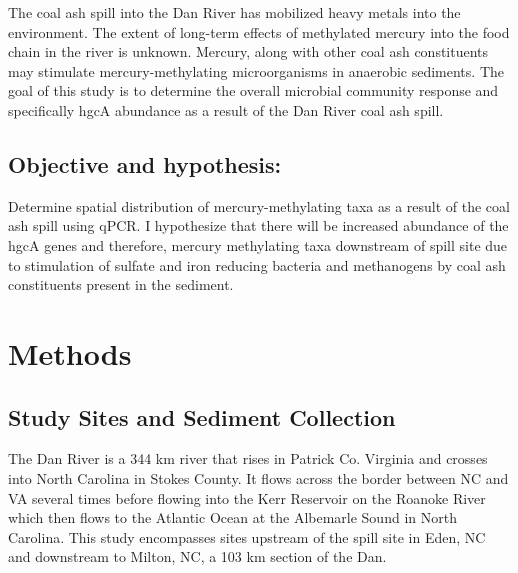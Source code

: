 \documentclass[ms]{uncgdissertationexp}
\theoremstyle{plain}
\theoremstyle{definition}
\theoremstyle{remark}
\begin{document}
  The coal ash spill into the Dan River has mobilized heavy metals into
  the environment. The extent of long-term effects of methylated mercury
  into the food chain in the river is unknown. Mercury, along with other
  coal ash constituents may stimulate mercury-methylating microorganisms
  in anaerobic sediments. The goal of this study is to determine the
  overall microbial community response and specifically hgcA abundance as
  a result of the Dan River coal ash spill.
  
  \subsection{Objective and hypothesis:}\label{objective-and-hypothesis}
  
  Determine spatial distribution of mercury-methylating taxa as a result
  of the coal ash spill using qPCR. I hypothesize that there will be
  increased abundance of the hgcA genes and therefore, mercury methylating
  taxa downstream of spill site due to stimulation of sulfate and iron
  reducing bacteria and methanogens by coal ash constituents present in
  the sediment.
  
  \section{Methods}\label{methods}
  
  \subsection{Study Sites and Sediment
  Collection}\label{study-sites-and-sediment-collection}
  
  The Dan River is a 344 km river that rises in Patrick Co. Virginia and
  crosses into North Carolina in Stokes County. It flows across the border
  between NC and VA several times before flowing into the Kerr Reservoir
  on the Roanoke River which then flows to the Atlantic Ocean at the
  Albemarle Sound in North Carolina. This study encompasses sites upstream
  of the spill site in Eden, NC and downstream to Milton, NC, a 103 km
  section of the Dan.
  
\end{document}
